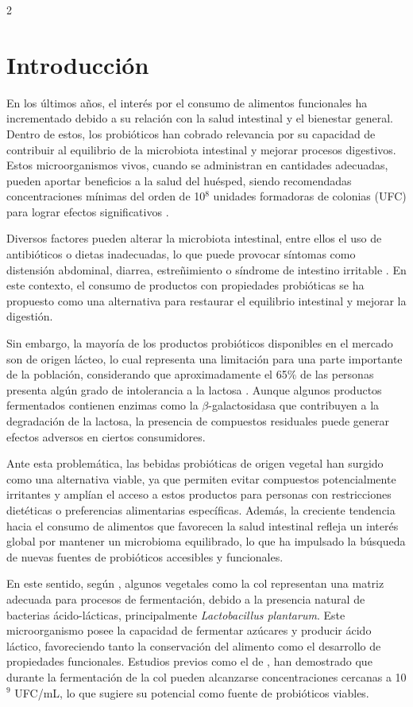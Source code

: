     \begin{multicols}{2}


\section{Introducción}

En los últimos años, el interés por el consumo de alimentos funcionales ha incrementado debido a su relación con la salud intestinal y el bienestar general. Dentro de estos, los probióticos han cobrado relevancia por su capacidad de contribuir al equilibrio de la microbiota intestinal y mejorar procesos digestivos. Estos microorganismos vivos, cuando se administran en cantidades adecuadas, pueden aportar beneficios a la salud del huésped, siendo recomendadas concentraciones mínimas del orden de 10$^{8}$ unidades formadoras de colonias (UFC) para lograr efectos significativos \citep{binda2020}.

Diversos factores pueden alterar la microbiota intestinal, entre ellos el uso de antibióticos o dietas inadecuadas, lo que puede provocar síntomas como distensión abdominal, diarrea, estreñimiento o síndrome de intestino irritable \citep{suez2019}. En este contexto, el consumo de productos con propiedades probióticas se ha propuesto como una alternativa para restaurar el equilibrio intestinal y mejorar la digestión.

Sin embargo, la mayoría de los productos probióticos disponibles en el mercado son de origen lácteo, lo cual representa una limitación para una parte importante de la población, considerando que aproximadamente el 65\% de las personas presenta algún grado de intolerancia a la lactosa \citep{storhaug2017}. Aunque algunos productos fermentados contienen enzimas como la $\beta$-galactosidasa que contribuyen a la degradación de la lactosa, la presencia de compuestos residuales puede generar efectos adversos en ciertos consumidores.

Ante esta problemática, las bebidas probióticas de origen vegetal han surgido como una alternativa viable, ya que permiten evitar compuestos potencialmente irritantes y amplían el acceso a estos productos para personas con restricciones dietéticas o preferencias alimentarias específicas. Además, la creciente tendencia hacia el consumo de alimentos que favorecen la salud intestinal refleja un interés global por mantener un microbioma equilibrado, lo que ha impulsado la búsqueda de nuevas fuentes de probióticos accesibles y funcionales.

En este sentido, según \citet{parrahuertas2010}, algunos vegetales como la col representan una matriz adecuada para procesos de fermentación, debido a la presencia natural de bacterias ácido-lácticas, principalmente \textit{Lactobacillus plantarum}. Este microorganismo posee la capacidad de fermentar azúcares y producir ácido láctico, favoreciendo tanto la conservación del alimento como el desarrollo de propiedades funcionales. Estudios previos como el de \citet{yoon2006}, han demostrado que durante la fermentación de la col pueden alcanzarse concentraciones cercanas a 10$^{9}$ UFC/mL, lo que sugiere su potencial como fuente de probióticos viables.


\end{multicols}
